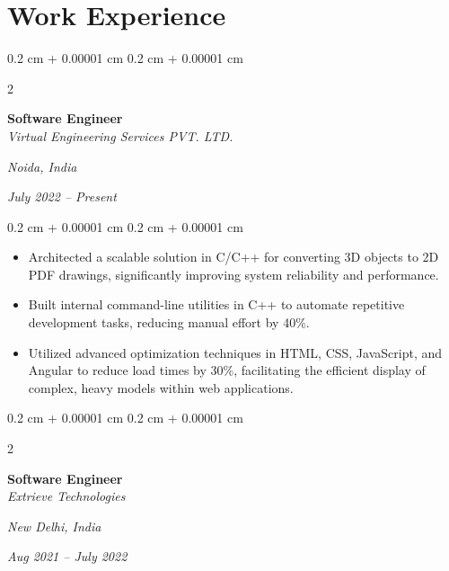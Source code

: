 \documentclass[10pt, letterpaper]{article}
\newenvironment{highlights}{
    \begin{itemize}[
        topsep=0.10 cm,
        parsep=0.10 cm,
        partopsep=0pt,
        itemsep=0pt,
        leftmargin=0.4 cm + 10pt
    ]
}{
    \end{itemize}
} %
\newenvironment{onecolentry}{
    \begin{adjustwidth}{
        0.2 cm + 0.00001 cm
    }{
        0.2 cm + 0.00001 cm
    }
}{
    \end{adjustwidth}
} %
\newenvironment{twocolentry}[2][]{
    \onecolentry
    \def\secondColumn{#2}
    \setcolumnwidth{\fill, 4.5 cm}
    \begin{paracol}{2}
}{
    \switchcolumn \raggedleft \secondColumn
    \end{paracol}
    \endonecolentry
} %
\begin{document}
    \section{Work Experience}

    \vspace{0.2 cm}

        \begin{twocolentry}{
        \textit{Noida, India}    

        \textit{July 2022 – Present}}
            \textbf{Software Engineer} \\
            \textit{Virtual Engineering Services PVT. LTD.}
        \end{twocolentry}

    \vspace{0.10 cm}
        \begin{onecolentry}
            \begin{highlights}
                \item Architected a scalable solution in C/C++ for converting 3D objects to 2D PDF drawings, significantly improving system reliability and performance.
                \item Built internal command-line utilities in C++ to automate repetitive development tasks, reducing manual effort by 40\%.
                \item Utilized advanced optimization techniques in HTML, CSS, JavaScript, and Angular to reduce load times by 30\%, facilitating the efficient display of complex, heavy models within web applications.
            \end{highlights}
        \end{onecolentry}

        \begin{twocolentry}{
        \textit{New Delhi, India}    
            
        \textit{Aug 2021 – July 2022}}
            \textbf{Software Engineer} \\
            \textit{Extrieve Technologies}
        \end{twocolentry}
\end{document}
